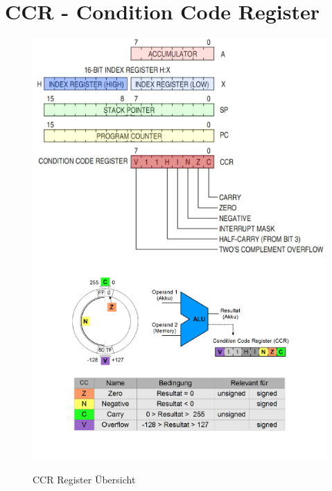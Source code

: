 \newpage
\section{CCR - Condition Code Register}

\begin{figure}[h!]
	\centering
	\includegraphics[scale=0.6]{../fig/ccr.pdf}
	\includegraphics[scale=0.6]{../fig/ccr_2.pdf}
	\caption{CCR Register Übersicht}
\end{figure}
